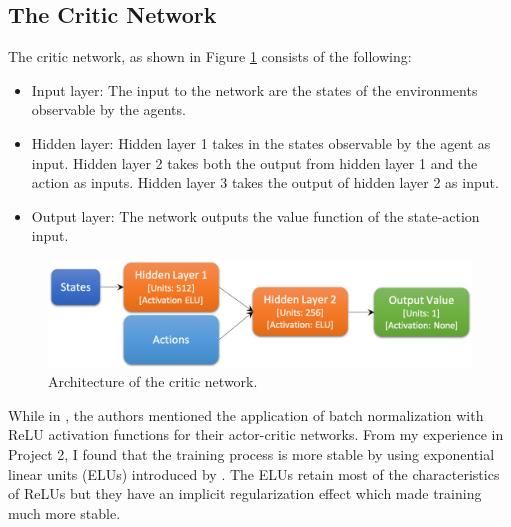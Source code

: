\documentclass[12pt,twoside]{article}
\begin{document}
\subsection{The Critic Network}

The critic network, as shown in Figure \ref{fig:critic_architecture} consists of the following:
	\begin{itemize}
		\item Input layer: The input to the network are the states of the environments observable by the agents.
		\item Hidden layer: Hidden layer 1 takes in the states observable by the agent as input. Hidden layer 2 takes both the output from hidden layer 1 and the action as inputs. Hidden layer 3 takes the output of hidden layer 2 as input.
		\item Output layer: The network outputs the value function of the state-action input.
	\end{itemize}
	
\begin{figure}[H]
	\begin{center}
		\includegraphics[width = 1\hsize]{./figures/Critic.png} 
		\caption{Architecture of the critic network.} %
		\label{fig:critic_architecture} %
	\end{center}
\end{figure}

While in \citep{lillicrap2015continuous}, the authors mentioned the application of batch normalization with ReLU activation functions for their actor-critic networks. From my experience in Project 2, I found that the training process is more stable by using exponential linear units (ELUs) introduced by \cite{clevert2015fast}. The ELUs retain most of the characteristics of ReLUs but they have an implicit regularization effect which made training much more stable.
\end{document}
